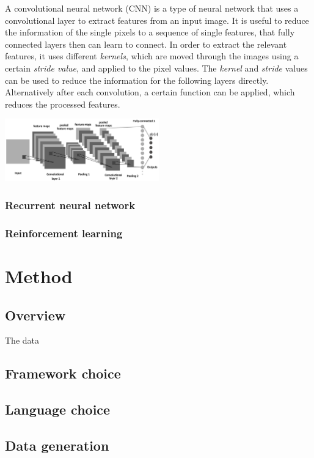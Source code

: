 \documentclass[12pt, a4paper, titlepage]{report}
\begin{document}
A convolutional neural network (CNN) is a type of neural network that uses a convolutional layer to extract features from an input image. It is useful to reduce the information of the single pixels to a sequence of single features, that fully connected layers then can learn to connect. In order to extract the relevant features, it uses different \emph{kernels}, which are moved through the images using a certain \emph{stride value}, and applied to the pixel values. The \emph{kernel} and \emph{stride} values can be used to reduce the information for the following layers directly. Alternatively after each convolution, a certain function can be applied, which reduces the processed features.

{
	\centering
	\includegraphics[width=0.5\textwidth]{../rc/images/cnn_architecture.png}
	\label{fig:cnn_architecture}
}


\subsection{Recurrent neural network}
\subsection{Reinforcement learning}


\chapter{Method}

\section{Overview}

The data 

\section{Framework choice}
\section{Language choice}



\section{Data generation}
\end{document}

